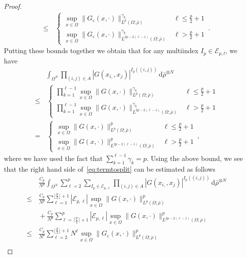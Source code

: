 \documentclass[a4paper,10pt,twoside]{amsart}
\theoremstyle{remark}
\theoremstyle{definition}
\numberwithin{equation}{section}
\newcommand{\eps}{\varepsilon}
\newcommand{\0}{{\bf 0}}
\newcommand{\+}{\hspace{-.5ex}+\hspace{-.5ex}}
\begin{document}
\begin{proof}
\begin{align}
 \leq &  \,
 \begin{cases}
  \displaystyle\sup_{x \in \Omega} \lVert  G_{\eps}(x,\cdot)\rVert_{L^p(\Omega;\bar\rho)}^{\gamma_k} & \ell \leq \frac p2 +1 \\
  \displaystyle \sup_{x \in \Omega} \lVert  G_{\eps}(x,\cdot)\rVert_{L^{2p-2(\ell-1)}(\Omega;\bar\rho)}^{\gamma_k} & \ell > \frac p2 +1
 \end{cases}
 \, .
\end{align}
Putting these bounds together we obtain that for any multiindex $I_p\in \mathcal{E}_{p,l}$, we have
\begin{align}
    &\int_{\Omega^N}\prod_{(i,j)\in A}|G(x_{i,},x_{j})|^{I_p((i,j))}\,\mathrm{{d}}\bar\rho^{\otimes N}\\\le & \,  \begin{cases}\displaystyle
  \prod_{k=1}^{\ell-1}\sup_{x \in \Omega} \lVert  G(x,\cdot)\rVert_{L^p(\Omega;\bar\rho)}^{\gamma_k} & \ell \leq \frac p2 +1 \\
  \displaystyle\prod_{k=1}^{\ell-1}\sup_{x \in \Omega} \lVert  G(x,\cdot)\rVert_{L^{2p-2(\ell-1)}(\Omega;\bar\rho)}^{\gamma_k} & \ell > \frac p2 +1
  \end{cases}\\
  =& \,\begin{cases}\displaystyle
  \sup_{x \in \Omega} \lVert  G(x,\cdot)\rVert_{L^p(\Omega;\bar\rho)}^{p} & \ell \leq \frac p2 +1 \\
  \displaystyle\sup_{x \in \Omega} \lVert  G(x,\cdot)\rVert_{L^{2p-2(\ell-1)}(\Omega;\bar\rho)}^{p} & \ell > \frac p2 +1
    \end{cases}\, ,
\end{align}
where we have used the fact that $\sum_{k=1}^{\ell-1}\gamma_k=p$.
Using the above bound, we see that the right hand side of~\eqref{eq:termtosplit} can be estimated as follows
\begin{align}
& \,\frac{{C_p}}{N^{p}}\int_{\Omega^N}\sum_{\ell=2}^p\sum_{I_{p}\in\mathcal{{E}}_{p,\ell}}\prod_{(i,j)\in A}|G(x_{i,},x_{j})|^{I_p((i,j))}\,\mathrm{{d}}\bar\rho^{\otimes N} \\
\leq & \, \frac{C_p}{N^{p}} \sum_{\ell=1}^{\lfloor\frac p2\rfloor +1}|\mathcal{E}_{p,\ell}| \sup_{x \in \Omega} \lVert  G(x,\cdot)\rVert_{L^p(\Omega;\bar\rho)}^{p}\\
& \, + \frac{C_p}{N^{p}} \sum_{\ell=\lceil\frac p2\rceil +1}^{p}|\mathcal{E}_{p,\ell}| \sup_{x \in \Omega} \lVert  G(x,\cdot)\rVert_{L^{2p-2(\ell-1)}(\Omega;\bar\rho)}^{p}\\
\leq & \, \frac{{C_p}}{N^{p}} \sum_{\ell=2}^{\lfloor\frac p2\rfloor +1} N^{\ell}\sup_{x \in \Omega} \lVert  G_{\eps}(x,\cdot)\rVert_{L^p(\Omega;\bar\rho)}^{p}\\

\end{align}
\end{proof}
\end{document}
